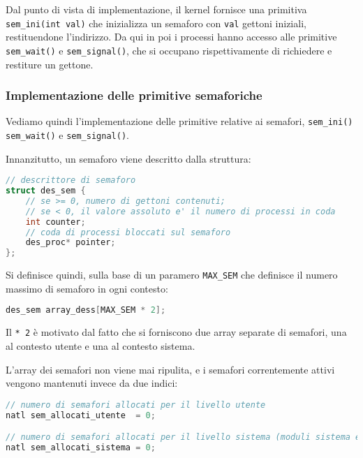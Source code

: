 \documentclass[a4paper,11pt]{article}
\begin{document}
Dal punto di vista di implementazione, il kernel fornisce una primitiva \lstinline|sem_ini(int val)| che inizializza un semaforo con \lstinline|val| gettoni iniziali, restituendone l'indirizzo.
Da qui in poi i processi hanno accesso alle primitive \lstinline|sem_wait()| e \lstinline|sem_signal()|, che si occupano rispettivamente di richiedere e restiture un gettone.

\subsubsection{Implementazione delle primitive semaforiche}
Vediamo quindi l'implementazione delle primitive relative ai semafori, \lstinline|sem_ini()| \lstinline|sem_wait()| e \lstinline|sem_signal()|.

Innanzitutto, un semaforo viene descritto dalla struttura:
\begin{lstlisting}[language=C++, style=codestyle]	
// descrittore di semaforo
struct des_sem {
	// se >= 0, numero di gettoni contenuti;
	// se < 0, il valore assoluto e' il numero di processi in coda
	int counter;
	// coda di processi bloccati sul semaforo
	des_proc* pointer;
};
\end{lstlisting}

Si definisce quindi, sulla base di un paramero \lstinline|MAX_SEM| che definisce il numero massimo di semaforo in ogni contesto:
\begin{lstlisting}[language=C++, style=codestyle]	
des_sem array_dess[MAX_SEM * 2];
\end{lstlisting}

Il \lstinline|* 2| è motivato dal fatto che si forniscono due array separate di semafori, una al contesto utente e una al contesto sistema.

L'array dei semafori non viene mai ripulita, e i semafori correntemente attivi vengono mantenuti invece da due indici:
\begin{lstlisting}[language=C++, style=codestyle]	
// numero di semafori allocati per il livello utente
natl sem_allocati_utente  = 0;

// numero di semafori allocati per il livello sistema (moduli sistema e I/O)
natl sem_allocati_sistema = 0;
\end{lstlisting}
\end{document}
